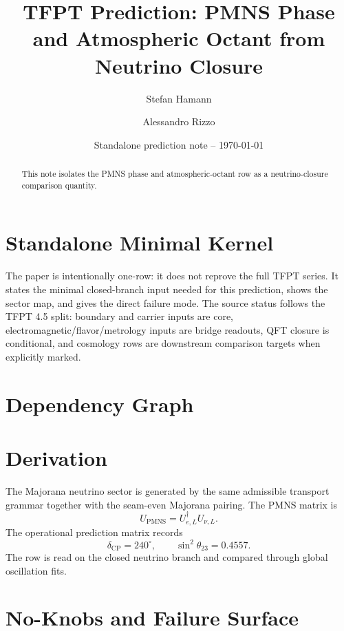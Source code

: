 \documentclass[11pt,a4paper]{article}
\title{\color{tfptblue}\textbf{TFPT Prediction: PMNS Phase and Atmospheric Octant from Neutrino Closure}}
\author{Stefan Hamann \and Alessandro Rizzo}
\date{{\normalsize\color{tfptgray}\sffamily Standalone prediction note -- \today}}
\begin{document}
\maketitle

\begin{abstract}
This note isolates the PMNS phase and atmospheric-octant row as a neutrino-closure comparison quantity.
\end{abstract}



\section{Standalone Minimal Kernel}
\MinimalKernelBox

The paper is intentionally one-row: it does not reprove the full TFPT series. It states the minimal closed-branch input needed for this prediction, shows the sector map, and gives the direct failure mode. The source status follows the TFPT 4.5 split: boundary and carrier inputs are core, electromagnetic/flavor/metrology inputs are bridge readouts, QFT closure is conditional, and cosmology rows are downstream comparison targets when explicitly marked.


\section{Dependency Graph}

\section{Derivation}

The Majorana neutrino sector is generated by the same admissible transport grammar together with the seam-even Majorana pairing. The PMNS matrix is
\[
U_{\mathrm{PMNS}}=U_{e,L}^{\dagger}U_{\nu,L}.
\]
The operational prediction matrix records
\[
\delta_{\mathrm{CP}}=240^\circ,
\qquad
\sin^2\theta_{23}=0.4557.
\]
The row is read on the closed neutrino branch and compared through global oscillation fits.


\section{No-Knobs and Failure Surface}
\end{document}
